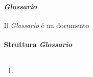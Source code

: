 \paragraph{\textit{Glossario}}
Il \textit{Glossario} é un documento 
\\\\
\textbf{Struttura \textit{Glossario}} 
\\\\

\begin{enumerate}
    \item 
\end{enumerate}
